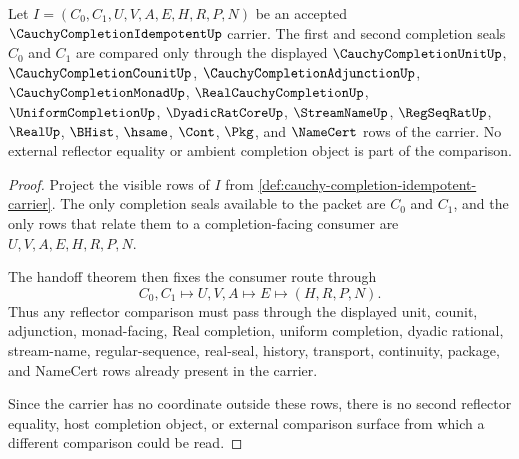 \begin{theorem}
\label{thm:cauchy-completion-idempotent-reflector-comparison}
Let $I=(C_0,C_1,U,V,A,E,H,R,P,N)$ be an accepted $\CauchyCompletionIdempotentUp$ carrier. The first and second completion seals $C_0$ and $C_1$ are compared only through the displayed $\CauchyCompletionUnitUp$, $\CauchyCompletionCounitUp$, $\CauchyCompletionAdjunctionUp$, $\CauchyCompletionMonadUp$, $\RealCauchyCompletionUp$, $\UniformCompletionUp$, $\DyadicRatCoreUp$, $\StreamNameUp$, $\RegSeqRatUp$, $\RealUp$, $\BHist$, $\hsame$, $\Cont$, $\Pkg$, and $\NameCert$ rows of the carrier. No external reflector equality or ambient completion object is part of the comparison.
\end{theorem}
\begin{proof}
Project the visible rows of $I$ from \autoref{def:cauchy-completion-idempotent-carrier}. The only completion seals available to the packet are $C_0$ and $C_1$, and the only rows that relate them to a completion-facing consumer are $U,V,A,E,H,R,P,N$.

The handoff theorem then fixes the consumer route through
$$
C_0,C_1\longmapsto U,V,A\longmapsto E\longmapsto(H,R,P,N).
$$
Thus any reflector comparison must pass through the displayed unit, counit, adjunction, monad-facing, Real completion, uniform completion, dyadic rational, stream-name, regular-sequence, real-seal, history, transport, continuity, package, and NameCert rows already present in the carrier.

Since the carrier has no coordinate outside these rows, there is no second reflector equality, host completion object, or external comparison surface from which a different comparison could be read.
\end{proof}

